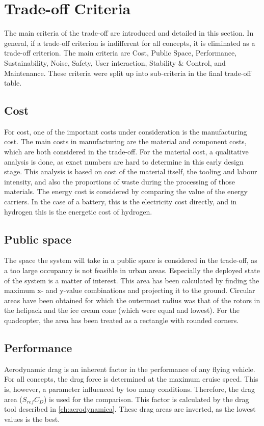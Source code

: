 \section{Trade-off Criteria}
The main criteria of the trade-off are introduced and detailed in this section. In general, if a trade-off criterion is indifferent for all concepts, it is eliminated as a trade-off criterion. The main criteria are Cost, Public Space, Performance, Sustainability, Noise, Safety, User interaction, Stability \& Control, and Maintenance. These criteria were split up into sub-criteria in the final trade-off table.

\subsection{Cost}
For cost, one of the important costs under consideration is the manufacturing cost. The main costs in manufacturing are the material and component costs, which are both considered in the trade-off. For the material cost, a qualitative analysis is done, as exact numbers are hard to determine in this early design stage. This analysis is based on cost of the material itself, the tooling and labour intensity, and also the proportions of waste during the processing of those materials. The energy cost is considered by comparing the value of the energy carriers. In the case of a battery, this is the electricity cost directly, and in hydrogen this is the energetic cost of hydrogen.

\subsection{Public space}
The space the system will take in a public space is considered in the trade-off, as a too large occupancy is not feasible in urban areas. Especially the deployed state of the system is a matter of interest. This area has been calculated by finding the maximum x- and y-value combinations and projecting it to the ground. Circular areas have been obtained for which the outermost radius was that of the rotors in the helipack and the ice cream cone (which were equal and lowest). For the quadcopter, the area has been treated as a rectangle with rounded corners. 


\subsection{Performance}
Aerodynamic drag is an inherent factor in the performance of any flying vehicle. For all concepts, the drag force is determined at the maximum cruise speed. This is, however, a parameter influenced by too many conditions. Therefore, the drag area ($S_{ref}C_D$) is used for the comparison. This factor is calculated by the drag tool described in \autoref{ch:aerodynamica}. These drag areas are inverted, as the lowest values is the best.

